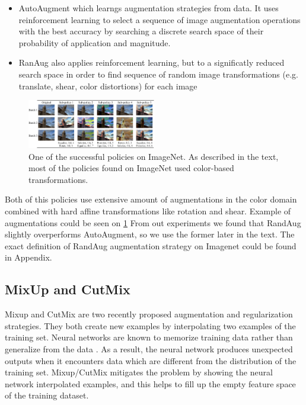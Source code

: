 \begin{itemize}
    \item AutoAugment \cite{cubuk2018_autoaugment} which learngs augmentation strategies from data. It uses reinforcement learning to select a sequence of image augmentation operations with the best accuracy by searching a discrete search space of their probability of application and magnitude.
    \item RanAug \cite{cubuk2020_randaugment} also applies reinforcement learning, but to a significatly reduced search space in order to find sequence of random image transformations (e.g. translate, shear, color distortions) for each image
\end{itemize}

\begin{figure}[h!]
    \caption{One of the successful policies on ImageNet. As described in the text, most of the policies found on ImageNet used color-based transformations.}
    \label{fig: randaug}
    \includegraphics[width=0.5\textwidth]{images/randaug_policy.png}
  \end{figure}

Both of this policies use extensive amount of augmentations in the color domain combined with hard affine transformations like rotation and shear. Example of augmentations could be seen on \ref{fig: randaug}
From out experiments we found that RandAug slightly overperforms AutoAugment, so we use the former later in the text. The exact definition of RandAug augmentation strategy on Imagenet could be found in Appendix. 


\subsection{MixUp and CutMix}



Mixup \cite{zhang2017_mixup} and CutMix \cite{yun2019_cutmix} are two recently proposed augmentation and regularization strategies. They both create new examples by interpolating two examples of the training set. Neural networks are known to memorize training data rather than generalize from the data \cite{zhang2016_understanding_deep}. As a result, the neural network produces unexpected outputs when it encounters data which are different from the distribution of the training set. Mixup/CutMix mitigates the problem by showing the neural network interpolated examples, and this helps to fill up the empty feature space of the training dataset.

